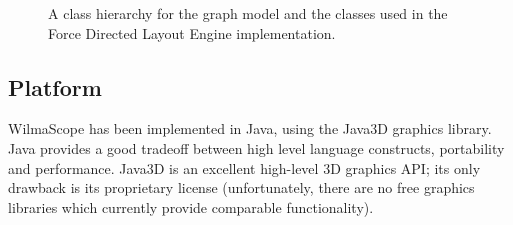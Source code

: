 \documentclass[runningheads]{cl2emult}
\begin{document}
\begin{figure}[h]
  \centering
  \caption{A class hierarchy for the graph model and the classes used
  in the Force Directed Layout Engine implementation.}
\end{figure}

\subsection{Platform}

WilmaScope has been implemented in Java, using the Java3D graphics library.
Java provides a good tradeoff between high level language constructs,
portability and performance.  Java3D is an excellent high-level 3D graphics
API; its only drawback is its proprietary license (unfortunately, there are
no free graphics libraries which currently provide comparable functionality).
\end{document}
